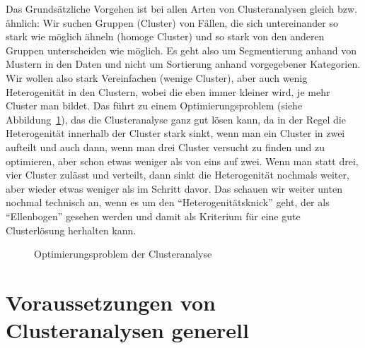 \documentclass[
  10pt,
  letterpaper,
  a4paper, twoside]{scrreprt}
\begin{document}
Das Grundsätzliche Vorgehen ist bei allen Arten von Clusteranalysen
gleich bzw. ähnlich: Wir suchen Gruppen (Cluster) von Fällen, die sich
untereinander so stark wie möglich ähneln (homoge Cluster) und so stark
von den anderen Gruppen unterscheiden wie möglich. Es geht also um
Segmentierung anhand von Mustern in den Daten und nicht um Sortierung
anhand vorgegebener Kategorien. Wir wollen also stark Vereinfachen
(wenige Cluster), aber auch wenig Heterogenität in den Clustern, wobei
die eben immer kleiner wird, je mehr Cluster man bildet. Das führt zu
einem Optimierungsproblem (siehe
Abbildung~\ref{fig-Clusteroptimierung}), das die Clusteranalyse ganz gut
lösen kann, da in der Regel die Heterogenität innerhalb der Cluster
stark sinkt, wenn man ein Cluster in zwei aufteilt und auch dann, wenn
man drei Cluster versucht zu finden und zu optimieren, aber schon etwas
weniger als von eins auf zwei. Wenn man statt drei, vier Cluster zulässt
und verteilt, dann sinkt die Heterogenität nochmals weiter, aber wieder
etwas weniger als im Schritt davor. Das schauen wir weiter unten nochmal
technisch an, wenn es um den \enquote{Heterogenitätsknick} geht, der als
\enquote{Ellenbogen} gesehen werden und damit als Kriterium für eine
gute Clusterlösung herhalten kann.

\begin{figure}


\caption{\label{fig-Clusteroptimierung}Optimierungsproblem der
Clusteranalyse}

\end{figure}%

\section{Voraussetzungen von Clusteranalysen
generell}\label{voraussetzungen-von-clusteranalysen-generell}
\end{document}
